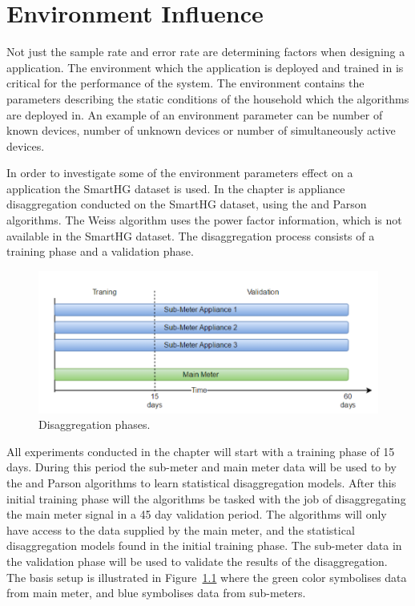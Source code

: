 \chapter{Environment Influence } 
\label{sec:EnvInf}
Not just the sample rate and error rate are determining factors when designing a  application. The environment which the application is deployed and trained in is critical for the performance of the system. The environment contains the parameters describing the static conditions of the household which the algorithms are deployed in. An example of an environment parameter can be number of known devices, number of unknown devices or number of simultaneously active devices.

In order to investigate some of the environment parameters effect on a  application the SmartHG dataset is used. In the chapter is appliance disaggregation conducted on the SmartHG dataset, using the  and Parson algorithms. The Weiss algorithm uses the power factor information, which is not available in the SmartHG dataset. The disaggregation process consists of a training phase and a validation phase. 

\begin{figure}[H]
\centering
\includegraphics[width=1\textwidth]{billeder/REAL.png}
\caption{Disaggregation phases.}
\label{fig:IDF}
\end{figure}

All experiments conducted in the chapter will start with a training phase of 15 days. During this period the sub-meter and main meter data will be used to by the  and Parson algorithms to learn statistical disaggregation models. After this initial training phase will the algorithms be tasked with the job of disaggregating the main meter signal in a 45 day validation period. The algorithms will only have access to the data supplied by the main meter, and the statistical disaggregation models found in the initial training phase. The sub-meter data in the validation phase will be used to validate the results of the disaggregation. The basis setup is illustrated in Figure~\ref{fig:IDF} where the green color symbolises data from main meter, and blue symbolises data from sub-meters. 


